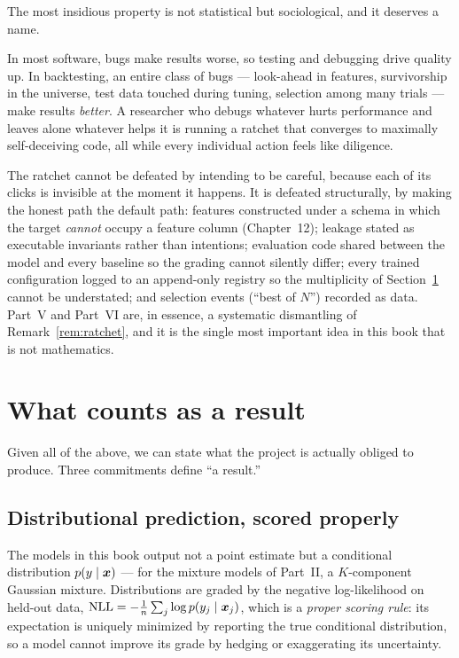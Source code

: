 The most insidious property is not statistical but sociological, and it
deserves a name.

\begin{remark}\label{rem:ratchet}
In most software, bugs make results worse, so testing and debugging drive
quality up. In backtesting, an entire class of bugs --- look-ahead in
features, survivorship in the universe, test data touched during tuning,
selection among many trials --- make results \emph{better}. A researcher who
debugs whatever hurts performance and leaves alone whatever helps it is
running a ratchet that converges to maximally self-deceiving code, all while
every individual action feels like diligence.
\end{remark}

The ratchet cannot be defeated by intending to be careful, because each of
its clicks is invisible at the moment it happens. It is defeated
structurally, by making the honest path the default path: features constructed
under a schema in which the target \emph{cannot} occupy a feature column
(Chapter~12); leakage stated as executable invariants rather than intentions;
evaluation code shared between the model and every baseline so the grading
cannot silently differ; every trained configuration logged to an append-only
registry so the multiplicity of Section~\ref{sec:whatisresult} cannot be
understated; and selection events (``best of $N$'') recorded as data. Part~V
and Part~VI are, in essence, a systematic dismantling of
Remark~\ref{rem:ratchet}, and it is the single most important idea in this
book that is not mathematics.

\section{What counts as a result}\label{sec:whatisresult}

Given all of the above, we can state what the project is actually obliged to
produce. Three commitments define ``a result.''

\subsection{Distributional prediction, scored properly}

The models in this book output not a point estimate but a conditional
distribution $p(y \mid \bm{x})$ --- for the mixture models of Part~II, a
$K$-component Gaussian mixture. Distributions are graded by the negative
log-likelihood on held-out data,
$\mathrm{NLL} = -\frac1n \sum_j \log p(y_j \mid \bm{x}_j)$, which is a \emph{proper
scoring rule}: its expectation is uniquely minimized by reporting the true
conditional distribution, so a model cannot improve its grade by hedging or
exaggerating its uncertainty.

